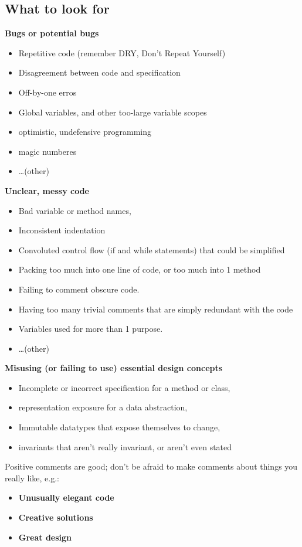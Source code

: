 \documentclass[10pt]{amsart}
\begin{document}
\begin{multicols*}{2}
\subsection{What to look for}

\textbf{Bugs or potential bugs}
\begin{itemize}
	\item Repetitive code (remember DRY, Don't Repeat Yourself)
	\item Disagreement between code and specification
	\item Off-by-one erros
	\item Global variables, and other too-large variable scopes
	\item optimistic, undefensive programming
	\item magic numberes
	\item \dots (other)
\end{itemize}

\textbf{Unclear, messy code}
\begin{itemize}
	\item Bad variable or method names, 
	\item Inconsistent indentation
	\item Convoluted control flow (if and while statements) that could be simplified
	\item Packing too much into one line of code, or too much into 1 method
	\item Failing to comment obscure code.
	\item Having too many trivial comments that are simply redundant with the code
	\item Variables used for more than 1 purpose.
	\item \dots (other)
\end{itemize}

\textbf{Misusing (or failing to use) essential design concepts}
\begin{itemize}
	\item Incomplete or incorrect specification for a method or class,
	\item representation exposure for a data abstraction,
	\item Immutable datatypes that expose themselves to change,
	\item invariants that aren't really invariant, or aren't even stated
\end{itemize}

Positive comments are good; don't be afraid to make comments about things you really like, e.g.:
\begin{itemize}
	\item \textbf{Unusually elegant code}
	\item \textbf{Creative solutions}
	\item \textbf{Great design}
\end{itemize}


\end{multicols*}
\end{document}
